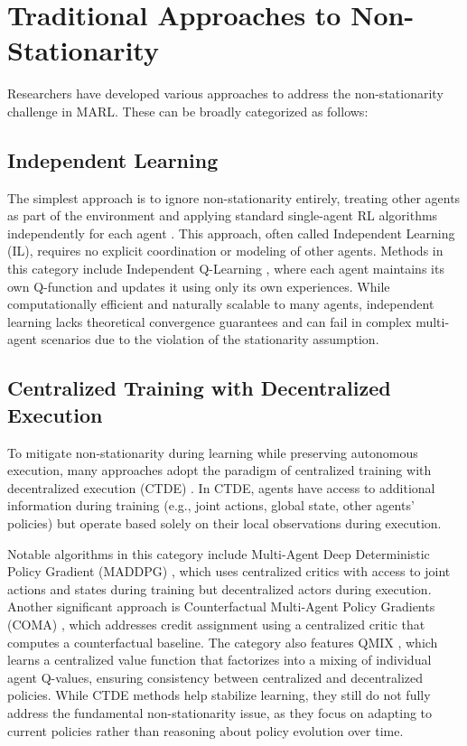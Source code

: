 \section{Traditional Approaches to Non-Stationarity}
Researchers have developed various approaches to address the non-stationarity challenge in MARL. These can be broadly categorized as follows:

\subsection{Independent Learning}
The simplest approach is to ignore non-stationarity entirely, treating other agents as part of the environment and applying standard single-agent RL algorithms independently for each agent \cite{tan1993multi}. This approach, often called Independent Learning (IL), requires no explicit coordination or modeling of other agents. Methods in this category include Independent Q-Learning \cite{tampuu2017multiagent}, where each agent maintains its own Q-function and updates it using only its own experiences. While computationally efficient and naturally scalable to many agents, independent learning lacks theoretical convergence guarantees and can fail in complex multi-agent scenarios due to the violation of the stationarity assumption.

\subsection{Centralized Training with Decentralized Execution}
To mitigate non-stationarity during learning while preserving autonomous execution, many approaches adopt the paradigm of centralized training with decentralized execution (CTDE) \cite{lowe2017multi, foerster2018counterfactual, sunehag2018value}. In CTDE, agents have access to additional information during training (e.g., joint actions, global state, other agents' policies) but operate based solely on their local observations during execution.

Notable algorithms in this category include Multi-Agent Deep Deterministic Policy Gradient (MADDPG) \cite{lowe2017multi}, which uses centralized critics with access to joint actions and states during training but decentralized actors during execution. Another significant approach is Counterfactual Multi-Agent Policy Gradients (COMA) \cite{foerster2018counterfactual}, which addresses credit assignment using a centralized critic that computes a counterfactual baseline. The category also features QMIX \cite{rashid2018qmix}, which learns a centralized value function that factorizes into a mixing of individual agent Q-values, ensuring consistency between centralized and decentralized policies. While CTDE methods help stabilize learning, they still do not fully address the fundamental non-stationarity issue, as they focus on adapting to current policies rather than reasoning about policy evolution over time.

